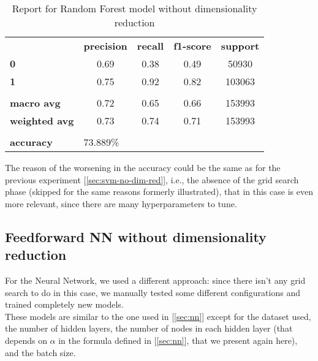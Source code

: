\begin{table}[h!]
    \centering
    \begin{tabular}{lcccc}
        \rowcolor[HTML]{EEEEEE} 
        \cellcolor[HTML]{FBFBFB} & \textbf{precision} & \textbf{recall} & \textbf{f1-score} & \textbf{support} \\
        \rowcolor[HTML]{EEEEEE} 
        \textbf{0}               & 0.69               & 0.38            & 0.49              & 50930            \\
        \rowcolor[HTML]{EEEEEE} 
        \textbf{1}               & 0.75               & 0.92            & 0.82              & 103063           \\
        \rowcolor[HTML]{FBFBFB} 
        &                    &                 &                   &                  \\
        \rowcolor[HTML]{EEEEEE} 
        \textbf{macro avg}       & 0.72               & 0.65            & 0.66              & 153993           \\
        \rowcolor[HTML]{EEEEEE} 
        \textbf{weighted avg}    & 0.73               & 0.74            & 0.71              & 153993           \\
        \rowcolor[HTML]{FBFBFB} 
        &                    &                 &                   &                  \\
        \rowcolor[HTML]{EEEEEE} 
        \textbf{accuracy}        & \multicolumn{4}{l}{\cellcolor[HTML]{EEEEEE}73.889\%}                         
    \end{tabular}
    \caption{Report for Random Forest model without dimensionality reduction}
    \label{tab:rf-res-no-dim-red}
\end{table}

The reason of the worsening in the accuracy could be the same as for the previous experiment [\ref{sec:svm-no-dim-red}], i.e., the absence of the grid search phase (skipped for the same reasons formerly illustrated), that in this case is even more relevant, since there are many hyperparameters to tune.


\newpage
\subsection{Feedforward NN without dimensionality reduction} \label{sec:nn-no-dim-red}

For the Neural Network, we used a different approach: since there isn't any grid search to do in this case, we manually tested some different configurations and trained completely new models.\\
These models are similar to the one used in [\ref{sec:nn}] except for the dataset used, the number of hidden layers, the number of nodes in each hidden layer (that depends on $\alpha$ in the formula defined in [\ref{sec:nn}], that we present again here), and the batch size.

